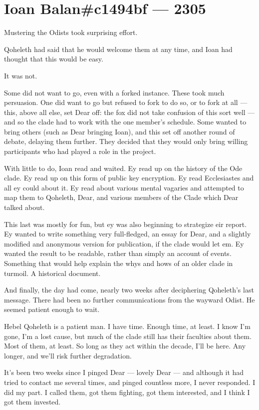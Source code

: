 \chapter*{Ioan Balan\#c1494bf — 2305}

Mustering the Odists took surprising effort.

Qoheleth had said that he would welcome them at any time, and Ioan had thought that this would be easy.

It was not.

Some did not want to go, even with a forked instance. These took much persuasion. One did want to go but refused to fork to do so, or to fork at all --- this, above all else, set Dear off: the fox did not take confusion of this sort well --- and so the clade had to work with the one member's schedule. Some wanted to bring others (such as Dear bringing Ioan), and this set off another round of debate, delaying them further. They decided that they would only bring willing participants who had played a role in the project.

With little to do, Ioan read and waited. Ey read up on the history of the Ode clade. Ey read up on this form of public key encryption. Ey read Ecclesiastes and all ey could about it. Ey read about various mental vagaries and attempted to map them to Qoheleth, Dear, and various members of the Clade which Dear talked about.

This last was mostly for fun, but ey was also beginning to strategize eir report. Ey wanted to write something very full-fledged, an essay for Dear, and a slightly modified and anonymous version for publication, if the clade would let em. Ey wanted the result to be readable, rather than simply an account of events. Something that would help explain the whys and hows of an older clade in turmoil. A historical document.

And finally, the day had come, nearly two weeks after deciphering Qoheleth's last message. There had been no further communications from the wayward Odist. He seemed patient enough to wait.

\secdiv{}

\noindent Hebel Qoheleth is a patient man. I have time. Enough time, at least. I know I'm gone, I'm a lost cause, but much of the clade still has their faculties about them. Most of them, at least. So long as they act within the decade, I'll be here. Any longer, and we'll risk further degradation.

It's been two weeks since I pinged Dear --- lovely Dear --- and although it had tried to contact me several times, and pinged countless more, I never responded. I did my part. I called them, got them fighting, got them interested, and I think I got them invested.

